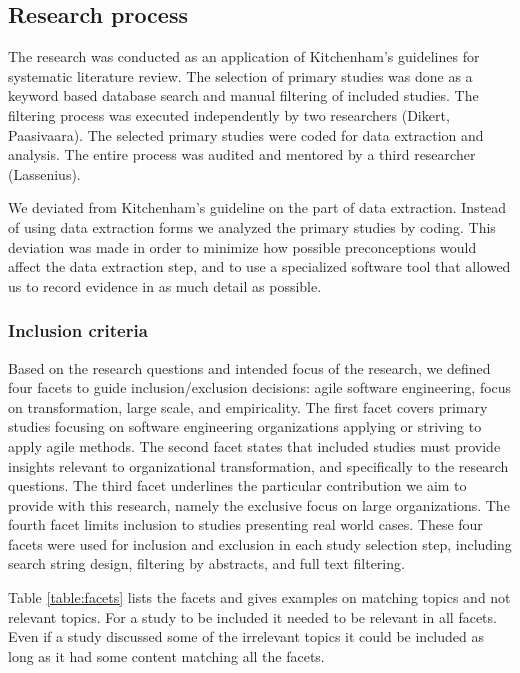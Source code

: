 \documentclass[preprint,authoryear,12pt]{elsarticle}
\begin{document}
\subsection{Research process}

The research was conducted as an application of Kitchenham's
\cite{Kitchenham2007} guidelines for systematic literature review. The selection
of primary studies was done as a keyword based database search and manual
filtering of included studies. The filtering process was executed independently
by two researchers (Dikert, Paasivaara). The selected primary studies were coded
for data extraction and analysis. The entire process was audited and mentored by
a third researcher (Lassenius).

We deviated from Kitchenham's guideline on the part of data extraction. Instead
of using data extraction forms we analyzed the primary studies by coding. This
deviation was made in order to minimize how possible preconceptions would affect
the data extraction step, and to use a specialized software tool that allowed us
to record evidence in as much detail as possible.

\subsubsection{Inclusion criteria}
\label{sec:inclusioncriteria}

Based on the research questions and intended focus of the research, we defined
four facets to guide inclusion/exclusion decisions: agile software engineering,
focus on transformation, large scale, and empiricality. The first facet covers
primary studies focusing on software engineering organizations applying or
striving to apply agile methods. The second facet states that included studies
must provide insights relevant to organizational transformation, and
specifically to the research questions. The third facet underlines the
particular contribution we aim to provide with this research, namely the
exclusive focus on large organizations. The fourth facet limits inclusion to
studies presenting real world cases. These four facets were used for inclusion
and exclusion in each study selection step, including search string design,
filtering by abstracts, and full text filtering.

Table \ref{table:facets} lists the facets and gives examples on matching topics
and not relevant topics. For a study to be included it needed to be relevant
in all facets. Even if a study discussed some of the irrelevant topics it could
be included as long as it had some content matching all the facets.
\end{document}
